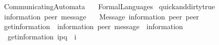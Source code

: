 %
\begin{isabellebody}%
%
%
\isadelimtheory
\isanewline
\isanewline
%
\endisadelimtheory
%
\isatagtheory
{}\isamarkupfalse%
\ CommunicatingAutomata\isanewline
\ \ \ FormalLanguages\isanewline
{}%
\endisatagtheory
{\isafoldtheory}%
%
\isadelimtheory
\isanewline
%
\endisadelimtheory
\isanewline
{}\isamarkupfalse%
\ {\isacharbrackleft}{\kern0pt}{\isacharbrackleft}{\kern0pt}quick{\isacharunderscore}{\kern0pt}and{\isacharunderscore}{\kern0pt}dirty{\isacharequal}{\kern0pt}true{\isacharbrackright}{\kern0pt}{\isacharbrackright}{\kern0pt}%
\isadelimdocument
%
\endisadelimdocument
%
\isatagdocument
%
\isamarkuptrue%
%
\isamarkuptrue%
%
\endisatagdocument
{\isafolddocument}%
%
\isadelimdocument
%
\endisadelimdocument
{}\isamarkupfalse%
\ {\isacharparenleft}{\kern0pt}{\isacharprime}{\kern0pt}information{\isacharcomma}{\kern0pt}\ {\isacharprime}{\kern0pt}peer{\isacharparenright}{\kern0pt}\ message\ {\isacharequal}{\kern0pt}\isanewline
\ \ Message\ {\isacharprime}{\kern0pt}information\ {\isacharprime}{\kern0pt}peer\ {\isacharprime}{\kern0pt}peer\ \ {\isacharparenleft}{\kern0pt}{\isachardoublequoteopen}{\isacharunderscore}{\kern0pt}\isactrlbsup {\isacharunderscore}{\kern0pt}{\isasymrightarrow}{\isacharunderscore}{\kern0pt}\isactrlesup {\isachardoublequoteclose}\ {\isacharbrackleft}{\kern0pt}{}{}{}{\isacharcomma}{\kern0pt}\ {}{}{}{\isacharcomma}{\kern0pt}\ {}{}{}{\isacharbrackright}{\kern0pt}\ {}{}{}{\isacharparenright}{\kern0pt}\isanewline
\isanewline
{}\isamarkupfalse%
\ get{\isacharunderscore}{\kern0pt}information\ {\isacharcolon}{\kern0pt}{\isacharcolon}{\kern0pt}\ {\isachardoublequoteopen}{\isacharparenleft}{\kern0pt}{\isacharprime}{\kern0pt}information{\isacharcomma}{\kern0pt}\ {\isacharprime}{\kern0pt}peer{\isacharparenright}{\kern0pt}\ message\ {\isasymRightarrow}\ {\isacharprime}{\kern0pt}information{\isachardoublequoteclose}\ \isanewline
\ \ {\isachardoublequoteopen}get{\isacharunderscore}{\kern0pt}information\ {\isacharparenleft}{\kern0pt}i\isactrlbsup p{\isasymrightarrow}q\isactrlesup {\isacharparenright}{\kern0pt}\ {\isacharequal}{\kern0pt}\ i{\isachardoublequoteclose}\isanewline
\isanewline
{}\isamarkupfalse%

\end{isabellebody}
